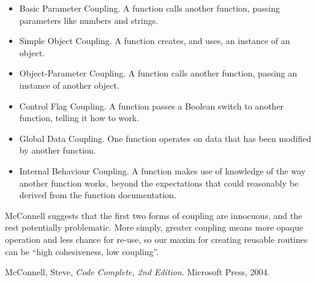 \documentclass[a4paper]{article}
\begin{document}
\begin{itemize}
\item Basic Parameter Coupling. A function calls another function, passing parameters like numbers and strings.
\item Simple Object Coupling. A function creates, and uses, an instance of an object.
\item Object-Parameter Coupling. A function calls another function, passing an instance of another object.
\item Control Flag Coupling. A function passes a Boolean switch to another function, telling it how to work.
\item Global Data Coupling. One function operates on data that has been modified by another function.
\item Internal Behaviour Coupling. A function makes use of knowledge of the way another function works, beyond the expectations that could reasonably be derived from the function documentation.
\end{itemize}

McConnell suggests that the first two forms of coupling are innocuous, and the rest potentially problematic. More simply, greater coupling means more opaque operation and less chance for re-use, so our maxim for creating reusable routines can be ``high cohesiveness, low coupling''.

\begin{thebibliography}{9}
   McConnell, Steve, \textit{Code Complete, 2nd Edition}. Microsoft Press, 2004.
\end{thebibliography}
\end{document}
